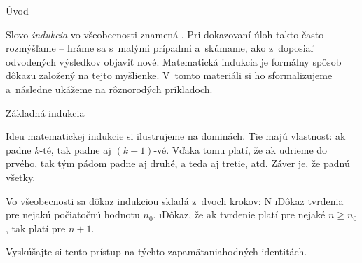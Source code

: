 





\sec Úvod

Slovo \textit{indukcia} vo všeobecnosti znamená . Pri dokazovaní úloh takto často rozmýšľame -- hráme sa s~malými prípadmi a~skúmame, ako z~doposiaľ odvodených výsledkov objaviť nové. Matematická indukcia je formálny spôsob dôkazu založený na tejto myšlienke. V~tomto materiáli si ho sformalizujeme a~následne ukážeme na rôznorodých príkladoch.

\sec Základná indukcia

Ideu matematickej indukcie si ilustrujeme na dominách. Tie majú vlastnosť: ak padne $k$-té, tak padne aj $(k+1)$-vé. Vďaka tomu platí, že ak udrieme do prvého, tak tým pádom padne aj druhé, a teda aj tretie, atď. Záver je, že padnú všetky. 


Vo všeobecnosti sa dôkaz indukciou skladá z~dvoch krokov:
\begitems \style N
\i Dôkaz tvrdenia pre nejakú počiatočnú hodnotu $n_0$.
\i Dôkaz, že ak tvrdenie platí pre nejaké $n \ge n_0$, tak platí pre $n+1$.
\enditems

Vyskúšajte si tento prístup na týchto zapamätaniahodných identitách.

